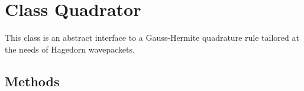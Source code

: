
\section{Class Quadrator}

    \label{Quadrator:Quadrator}
This class is an abstract interface to a Gauss-Hermite quadrature rule
tailored at the needs of Hagedorn wavepackets.



  \subsection{Methods}

    \label{Quadrator:Quadrator:__init__}

    \vspace{0.5ex}

